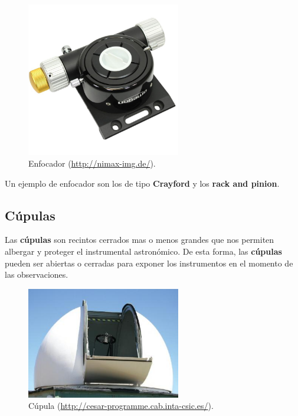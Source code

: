 \bigskip
\begin{figure}[!ht]
  \begin{center}
  \includegraphics[width=0.6\textwidth]{../images/enfocador.jpg}
  \caption{Enfocador (\href{http://nimax-img.de/}{http://nimax-img.de/}).}
  \label{fig:diag_scrum}
  \end{center}
\end{figure}

\bigskip
Un ejemplo de enfocador son los de tipo \textbf{Crayford} y los \textbf{rack and pinion}.

\subsection{Cúpulas}
Las \textbf{cúpulas} son recintos cerrados mas o menos grandes que nos permiten albergar y proteger el instrumental astronómico. De esta forma, las \textbf{cúpulas} pueden ser abiertas o cerradas para exponer los instrumentos en el momento de las observaciones.

\bigskip
\begin{figure}[!ht]
  \begin{center}
  \includegraphics[width=0.6\textwidth]{../images/cupula.jpg}
  \caption{Cúpula (\href{http://cesar-programme.cab.inta-csic.es/}{http://cesar-programme.cab.inta-csic.es/}).}
  \label{fig:diag_scrum}
  \end{center}
\end{figure}

